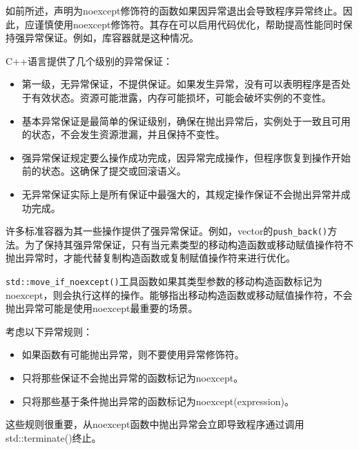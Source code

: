 
如前所述，声明为noexcept修饰符的函数如果因异常退出会导致程序异常终止。因此，应谨慎使用noexcept修饰符。其存在可以启用代码优化，帮助提高性能同时保持强异常保证。例如，库容器就是这种情况。

\begin{myNotic}
C++语言提供了几个级别的异常保证：

\begin{itemize}
\item
第一级，无异常保证，不提供保证。如果发生异常，没有可以表明程序是否处于有效状态。资源可能泄露，内存可能损坏，可能会破坏实例的不变性。

\item
基本异常保证是最简单的保证级别，确保在抛出异常后，实例处于一致且可用的状态，不会发生资源泄漏，并且保持不变性。

\item
强异常保证规定要么操作成功完成，因异常完成操作，但程序恢复到操作开始前的状态。这确保了提交或回滚语义。

\item
无异常保证实际上是所有保证中最强大的，其规定操作保证不会抛出异常并成功完成。
\end{itemize}
\end{myNotic}

许多标准容器为其一些操作提供了强异常保证。例如，vector的\verb|push_back()|方法。为了保持其强异常保证，只有当元素类型的移动构造函数或移动赋值操作符不抛出异常时，才能代替复制构造函数或复制赋值操作符来进行优化。

\verb|std::move_if_noexcept()|工具函数如果其类型参数的移动构造函数标记为noexcept，则会执行这样的操作。能够指出移动构造函数或移动赋值操作符，不会抛出异常可能是使用noexcept最重要的场景。

考虑以下异常规则：

\begin{itemize}
\item
如果函数有可能抛出异常，则不要使用异常修饰符。

\item
只将那些保证不会抛出异常的函数标记为noexcept。

\item
只将那些基于条件抛出异常的函数标记为noexcept(expression)。
\end{itemize}

这些规则很重要，从noexcept函数中抛出异常会立即导致程序通过调用std::terminate()终止。

